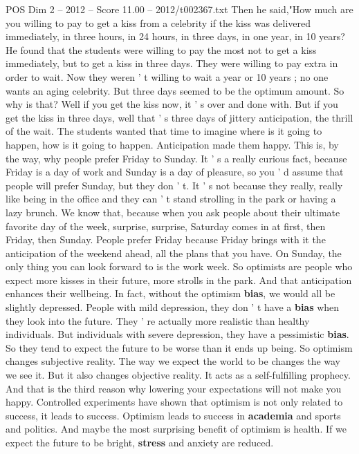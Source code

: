 \begin{textsample}{POS Dim 2 – 2012 – Score 11.00 – 2012/t002367.txt}
Then he said,"How much are you willing to pay to get a kiss from a celebrity if the kiss was delivered immediately, in three hours, in 24 hours, in three days, in one year, in 10 years?
He found that the students were willing to pay the most not to get a kiss immediately, but to get a kiss in three days.
They were willing to pay extra in order to wait.
Now they weren ' t willing to wait a year or 10 years ; no one wants an aging celebrity.
But three days seemed to be the optimum amount.
So why is that?
Well if you get the kiss now, it ' s over and done with.
But if you get the kiss in three days, well that ' s three days of jittery anticipation, the thrill of the wait.
The students wanted that time to imagine where is it going to happen, how is it going to happen.
Anticipation made them happy.
This is, by the way, why people prefer Friday to Sunday.
It ' s a really curious fact, because Friday is a day of work and Sunday is a day of pleasure, so you ' d assume that people will prefer Sunday, but they don ' t.
It ' s not because they really, really like being in the office and they can ' t stand strolling in the park or having a lazy brunch.
We know that, because when you ask people about their ultimate favorite day of the week, surprise, surprise, Saturday comes in at first, then Friday, then Sunday.
People prefer Friday because Friday brings with it the anticipation of the weekend ahead, all the plans that you have.
On Sunday, the only thing you can look forward to is the work week.
So optimists are people who expect more kisses in their future, more strolls in the park.
And that anticipation enhances their wellbeing.
In fact, without the optimism \textbf{bias}, we would all be slightly depressed.
People with mild depression, they don ' t have a \textbf{bias} when they look into the future.
They ' re actually more realistic than healthy individuals.
But individuals with severe depression, they have a pessimistic \textbf{bias}.
So they tend to expect the future to be worse than it ends up being.
So optimism changes subjective reality.
The way we expect the world to be changes the way we see it.
But it also changes objective reality.
It acts as a self-fulfilling prophecy.
And that is the third reason why lowering your expectations will not make you happy.
Controlled experiments have shown that optimism is not only related to success, it leads to success.
Optimism leads to success in \textbf{academia} and sports and politics.
And maybe the most surprising benefit of optimism is health.
If we expect the future to be bright, \textbf{stress} and anxiety are reduced.

\end{textsample}
